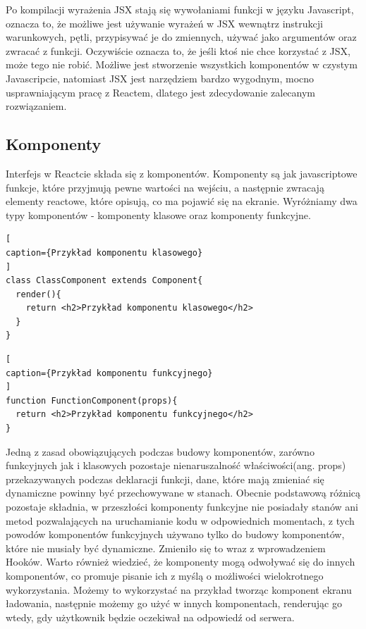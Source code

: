 \documentclass[oneside,polski,logo,indent]{amuthesis}
\begin{document}
\begin{enumerate}
\begin{enumerate}
{Po kompilacji wyrażenia JSX stają się wywołaniami funkcji w języku Javascript, oznacza to, że możliwe jest używanie wyrażeń w JSX wewnątrz instrukcji warunkowych, pętli, przypisywać je do zmiennych, używać jako argumentów oraz zwracać z funkcji.
Oczywiście oznacza to, że jeśli ktoś nie chce korzystać z JSX, może tego nie robić. Możliwe jest stworzenie wszystkich komponentów w czystym Javascripcie, natomiast JSX jest narzędziem bardzo wygodnym, mocno usprawniającym pracę z Reactem, dlatego jest zdecydowanie zalecanym rozwiązaniem.

}

\subsection{Komponenty}
{
Interfejs w Reactcie składa się z komponentów. Komponenty są jak javascriptowe funkcje, które przyjmują pewne wartości na wejściu, a następnie zwracają elementy reactowe, które opisują, co ma pojawić się na ekranie.
Wyróżniamy dwa typy komponentów - komponenty klasowe oraz komponenty funkcyjne.


\begin{lstlisting}[
caption={Przykład komponentu klasowego}
]
class ClassComponent extends Component{
  render(){
    return <h2>Przykład komponentu klasowego</h2>
  }
}

\end{lstlisting}


\begin{lstlisting}[
caption={Przykład komponentu funkcyjnego}
]
function FunctionComponent(props){
  return <h2>Przykład komponentu funkcyjnego</h2>
}

\end{lstlisting}

Jedną z zasad obowiązujących podczas budowy komponentów, zarówno funkcyjnych jak i klasowych pozostaje nienaruszalność właściwości(ang. props) przekazywanych podczas deklaracji funkcji, dane, które mają zmieniać się dynamiczne powinny być przechowywane w stanach.
Obecnie podstawową różnicą pozostaje składnia, w przeszłości komponenty funkcyjne nie posiadały stanów ani metod pozwalających na uruchamianie kodu w odpowiednich momentach, z tych powodów komponentów funkcyjnych używano tylko do budowy komponentów, które nie musiały być dynamiczne. Zmieniło się to wraz z wprowadzeniem Hooków.
Warto również wiedzieć, że komponenty mogą odwoływać się do innych komponentów, co promuje pisanie ich z myślą o możliwości wielokrotnego wykorzystania. Możemy to wykorzystać na przykład tworząc komponent ekranu ładowania, następnie możemy go użyć w innych komponentach, renderując go wtedy, gdy użytkownik będzie oczekiwał na odpowiedź od serwera.



}
\end{enumerate}
\end{enumerate}
\end{document}
